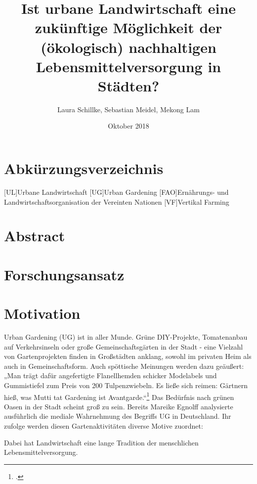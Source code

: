 \documentclass{scrartcl}
\title{Ist urbane Landwirtschaft eine zukünftige Möglichkeit der (ökologisch) nachhaltigen Lebensmittelversorgung in Städten?}
\author{Laura Schillke, Sebastian Meidel, Mekong Lam }
\date{Oktober 2018}
\begin{document}
\maketitle


\newpage

\setcounter{tocdepth}{3}
\tableofcontents 



\newpage
\section{Abkürzungsverzeichnis}

\begin{acronym}
	[UL]{Urbane Landwirtschaft}
	[UG]{Urban Gardening}
	[FAO]{Ernährungs- und Landwirtschaftsorganisation der Vereinten Nationen} 
	[VF]{Vertikal Farming}
\end{acronym}


\newpage

\section{Abstract}

\section{Forschungsansatz}

\section{Motivation}

Urban Gardening (UG) ist in aller Munde. Grüne DIY-Projekte, Tomatenanbau auf Verkehrsinseln oder große Gemeinschaftsgärten in der Stadt - eine Vielzahl von Gartenprojekten finden in Großstädten anklang, sowohl im privaten Heim als auch in Gemeinschaftsform. Auch spöttische Meinungen werden dazu geäußert: „Man trägt dafür angefertigte Flanellhemden schicker Modelabels und Gummistiefel zum Preis von 200 Tulpenzwiebeln. Es ließe sich reimen: Gärtnern hieß, was Mutti tat Gardening ist Avantgarde.“\footcite{HugendeckZeit}
Das Bedürfnis nach grünen Oasen in der Stadt scheint groß zu sein. 
Bereits Mareike Egnolff analysierte ausführlich die mediale Wahrnehmung des Begriffs UG in Deutschland. Ihr zufolge werden diesen Gartenaktivitäten diverse Motive zuordnet: 

Dabei hat Landwirtschaft eine lange Tradition der menschlichen Lebensmittelversorgung.
\end{document}
